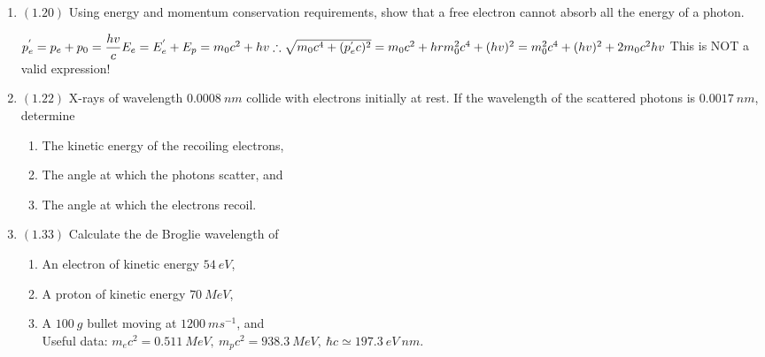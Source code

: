 \documentclass[fleqn]{article}
\begin{document}
\begin{enumerate}
    \item $(\mathbf{1.20})$ Using energy and momentum conservation requirements, show that a free electron cannot absorb all the energy of a photon.

      \textcolor{hwColor}{
        $
          p^{'}_e=p_e+p_0=\dfrac{hv}{c} \\
          \\
          E_e=E^{'}_e+E_p=m_0c^2+hv \\
          \\
          \therefore \sqrt{m_0c^4+(p^{'}_e c)^2}=m_0c^2+hr \\
          \\
          m^2_0c^4+(hv)^2=m^2_0c^4+(hv)^2+2m_0c^2hv \\ \\
        $
        This is NOT a valid expression!
      }

    \item $(\mathbf{1.22})$ X-rays of wavelength $0.0008 ~ nm$ collide with electrons initially at rest. If the wavelength of the scattered photons is 
    $0.0017 ~ nm$, determine
      \begin{enumerate}
        \item The kinetic energy of the recoiling electrons,
        \item The angle at which the photons scatter, and
        \item The angle at which the electrons recoil. 
      \end{enumerate}

    \item $(\mathbf{1.33})$ Calculate the de Broglie wavelength of
      \begin{enumerate}
        \item An electron of kinetic energy $54 ~ eV$, 
        \item A proton of kinetic energy $70 ~ MeV$, 
        \item A $100 ~ g$ bullet moving at $1200 ~ ms^{-1}$, and \\

        Useful data: $m_ec^2=0.511 ~ MeV, ~ m_pc^2=938.3 ~ MeV, ~ \hbar c \simeq 197.3 ~ eV ~ nm$.
      \end{enumerate}

  \end{enumerate}
\end{document}
